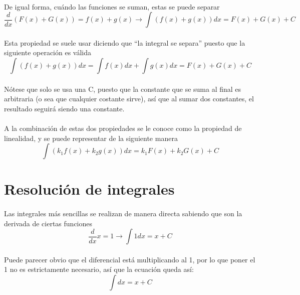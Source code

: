 \documentclass{book}
\begin{document}
            \paragraph{}De igual forma, cuándo las funciones se suman, estas se puede separar
            \begin{equation}
            \frac{d}{dx}\left(F(x)+G(x)\right) =f(x)+g(x)\rightarrow\int{\left(f(x)+g(x)\right)}dx=F(x)+G(x)+C
            \end{equation}
            \paragraph{}Esta propiedad se suele usar diciendo que ``la integral se separa'' puesto que la siguiente operación es válida
            \begin{equation}
            \int{\left(f(x)+g(x)\right)}dx=\int{f(x)}dx+\int{g(x)}dx=F(x)+G(x)+C
            \end{equation}
            \paragraph{}Nótese que solo se usa una C, puesto que la constante que se suma al final es arbitraria (o sea que cualquier costante sirve), así que al sumar dos constantes, el resultado seguirá siendo una constante.
            \paragraph{}A la combinación de estas dos propiedades se le conoce como la propiedad de linealidad, y se puede representar de la siguiente manera
            \begin{equation}
            \int{\left(k_1f(x)+k_2g(x)\right)}dx=k_1F(x)+k_2G(x)+C
            \end{equation}
        \section{Resolución de integrales}
            \paragraph{}Las integrales más sencillas se realizan de manera directa sabiendo que son la derivada de ciertas funciones
            $$\frac{d}{dx}x=1\rightarrow\int{1}dx=x+C$$
            \paragraph{}Puede parecer obvio que el diferencial está multiplicando al 1, por lo que poner el 1 no es estrictamente necesario, así que la ecuación queda así:
            \begin{equation}
            \int{dx}=x+C
            \end{equation}
\end{document}

